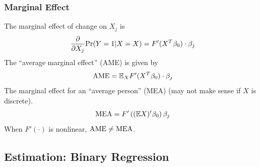 \documentclass[11pt]{elegantbook}
\begin{document}
\subsubsection*{Marginal Effect}
The marginal effect of change on $X_j$ is
\begin{equation}
    \begin{aligned}
        \frac{\partial}{\partial X_j}\textnormal{Pr}(Y=1|X=X)=F'(X^T\beta_0)\cdot\beta_j
    \end{aligned}
    \nonumber
\end{equation}
The ``average marginal effect'' (AME) is given by
\begin{equation}
    \begin{aligned}
        \textnormal{AME}=\mathbb{E}_X F'(X^T\beta_0)\cdot\beta_j\\
    \end{aligned}
    \nonumber
\end{equation}
The marginal effect for an ``average person'' (MEA) (may not make sense if $X$ is discrete).
\begin{equation}
    \begin{aligned}
        \textnormal{MEA}=F'\left((\mathbb{E}X)'\beta_0\right)\beta_j
    \end{aligned}
    \nonumber
\end{equation}
When $F'(\cdot)$ is nonlinear, $\textnormal{AME}\neq \textnormal{MEA}$.

\subsection{Estimation: Binary Regression}
\end{document}
